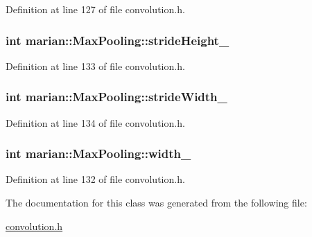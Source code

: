 Definition at line 127 of file convolution.\+h.

\subsubsection[{\texorpdfstring{stride\+Height\+\_\+}{strideHeight_}}]{\setlength{\rightskip}{0pt plus 5cm}int marian\+::\+Max\+Pooling\+::stride\+Height\+\_\+\hspace{0.3cm}{\ttfamily [protected]}}\hypertarget{classmarian_1_1MaxPooling_a102c8a1113206b621dff3e8fb141af6d}{}\label{classmarian_1_1MaxPooling_a102c8a1113206b621dff3e8fb141af6d}


Definition at line 133 of file convolution.\+h.

\subsubsection[{\texorpdfstring{stride\+Width\+\_\+}{strideWidth_}}]{\setlength{\rightskip}{0pt plus 5cm}int marian\+::\+Max\+Pooling\+::stride\+Width\+\_\+\hspace{0.3cm}{\ttfamily [protected]}}\hypertarget{classmarian_1_1MaxPooling_a9a2da00f129f889191418d6ee2932b26}{}\label{classmarian_1_1MaxPooling_a9a2da00f129f889191418d6ee2932b26}


Definition at line 134 of file convolution.\+h.

\subsubsection[{\texorpdfstring{width\+\_\+}{width_}}]{\setlength{\rightskip}{0pt plus 5cm}int marian\+::\+Max\+Pooling\+::width\+\_\+\hspace{0.3cm}{\ttfamily [protected]}}\hypertarget{classmarian_1_1MaxPooling_a4128608033be5e33a62c1fc9a0f0e3f0}{}\label{classmarian_1_1MaxPooling_a4128608033be5e33a62c1fc9a0f0e3f0}


Definition at line 132 of file convolution.\+h.



The documentation for this class was generated from the following file\+:\begin{DoxyCompactItemize}
\item 
\hyperlink{convolution_8h}{convolution.\+h}\end{DoxyCompactItemize}
